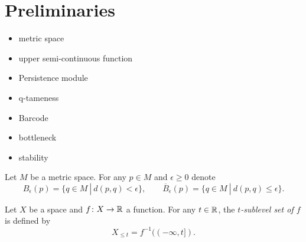 
\section{Preliminaries}

\begin{itemize}
	\item metric space
	\item upper semi-continuous function
	\item Persistence module
	\item q-tameness
	\item Barcode
	\item bottleneck
	\item stability
\end{itemize}

\begin{defi}
	Let $M$ be a metric space. For any $p \in M$ and $\epsilon \geq 0$ denote
	\begin{equation*}
	B_\epsilon(p) = \{q \in M\ |\ d(p,q) < \epsilon\}, \qquad
	\overline B_\epsilon(p) = \{q \in M\ |\ d(p,q) \leq \epsilon\}.
	\end{equation*}
\end{defi}

\begin{defi}
	Let $X$ be a space and $f \colon X \to \mathbb{R}$ a function. For any $t \in \mathbb{R}$, the \textit{$t$-sublevel set of $f$} is defined by 
	\begin{equation*}
	X_{\leq t} = f^{-1}((-\infty, t]).
	\end{equation*}
\end{defi}